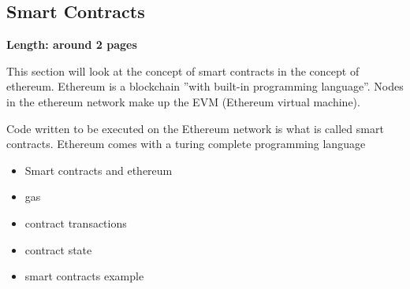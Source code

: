 \subsection{Smart Contracts}

\textbf{Length: around 2 pages}

This section will look at the concept of smart contracts in the concept of ethereum.
Ethereum is a blockchain ''with built-in programming language''. Nodes in the ethereum network make up the EVM (Ethereum virtual machine).

Code written to be executed on the Ethereum network is what is called smart contracts.
Ethereum comes with a turing complete programming language

\begin{itemize}
  \item Smart contracts and ethereum
  \item gas
  \item contract transactions
  \item contract state
  \item smart contracts example
\end{itemize}
